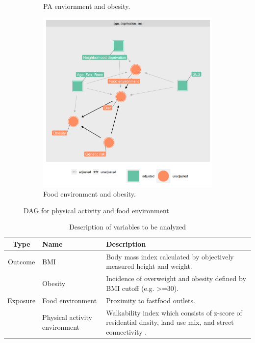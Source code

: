 \documentclass[12]{article}
\begin{document}
\begin{description}
\begin{figure}[h!]
\begin{subfigure}[b]{0.4\linewidth}
    \caption{PA enviornment and obesity.}
  \end{subfigure}
  \begin{subfigure}[b]{0.4\linewidth}
    \includegraphics[width=\linewidth]{graph/dag3.png}
    \caption{Food environment and obesity.}
  \end{subfigure}
  \caption{DAG for physical activity and food environment}
  \label{fig:flight}
\end{figure}      

\newpage
	    \begin{table}[h!]
		    \caption{Description of variables to be analyzed}
		    \label{table:aim1}
		      \centering
		      \begin{tabular}{ c l p{5cm} }
			    \hline
			    Type & Name & Description\\
			    \hline \hline
			    Outcome & BMI & Body mass index calculated by objectively measured height and weight.\\
			            & Obesity & Incidence of overweight and obesity defined by BMI cutoff (e.g. >=30).\\
			    Exposure & Food environment & Proximity to fastfood outlets.\\
			             & Physical activity environment & Walkability index which consists of z-score of residential dnsity, land use mix, and street connectivity \cite{sundquist2011neighborhood}.\\
			             

\end{tabular}
\end{table}
\end{description}
\end{document}
